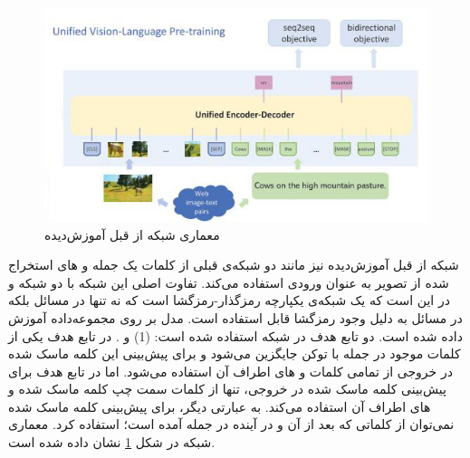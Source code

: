 	\begin{figure}
		\centerline{\includegraphics[scale=0.7]{images/VLP.JPG}}
		\caption[معماری شبکه از قبل آموزش‌دیده]{معماری شبکه از قبل آموزش‌دیده\cite{zhou2020unified}}
		\label{fig:VLP}
	\end{figure}
	
	شبکه از قبل آموزش‌دیده
	نیز مانند دو شبکه‌ی قبلی از کلمات یک جمله و
	های استخراج شده از تصویر به عنوان ورودی استفاده می‌کند. تفاوت اصلی این شبکه با دو شبکه
	و 
	در این است که یک شبکه‌ی یکپارچه رمزگذار-رمزگشا است که نه تنها در مسائل 
	بلکه در مسائل
	به دلیل وجود رمزگشا قابل استفاده است. مدل 
	بر روی  مجموعه‌داده
	آموزش داده شده است. دو تابع هدف در شبکه
	استفاده شده است: (1) 
	و 
	.
	در تابع هدف
	یکی از کلمات موجود در جمله با توکن 
	\lr{[MASK]}
	جایگزین می‌شود و برای پیش‌بینی این کلمه ماسک شده در خروجی از تمامی کلمات و 
	های اطراف آن استفاده می‌شود. اما در تابع هدف 
	برای پیش‌بینی کلمه ماسک شده در خروجی، تنها از کلمات سمت چپ کلمه ماسک شده و 
	های اطراف آن استفاده می‌کند. به عبارتی دیگر، برای پیش‌بینی کلمه ماسک شده نمی‌توان از کلماتی که بعد از  آن و در آینده در جمله آمده است؛ استفاده کرد. معماری شبکه 
	در شکل 
	\ref{fig:VLP}
	نشان داده شده است.
	
